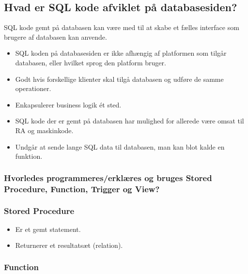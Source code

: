 \newpage

\subsection{Hvad er SQL kode afviklet på databasesiden?}

SQL	kode gemt på databasen kan være	med	til	at skabe et	fælles interface som	brugere	af databasen kan anvende.

\begin{itemize}
	\item SQL koden	på databasesiden er	ikke afhængig af platformen	som	tilgår	databasen, eller hvilket sprog den platform	bruger.
	\item Godt hvis forskellige klienter skal tilgå databasen og udføre de samme operationer.
	\item Enkapsulerer business logik ét sted.
	\item SQL kode der er gemt på databasen	har	mulighed for allerede være omsat til	RA og maskinkode.
	\item Undgår at	sende lange	SQL	data til databasen,	man	kan	blot kalde en	funktion.
\end{itemize}

\subsubsection{Hvorledes programmeres/erklæres og bruges Stored Procedure, Function, Trigger og View?}

\subsubsection{Stored Procedure}

\begin{itemize}
	\item Er et gemt statement.
	\item Returnerer et resultatsæt (relation).
\end{itemize}

\subsubsection{Function}

